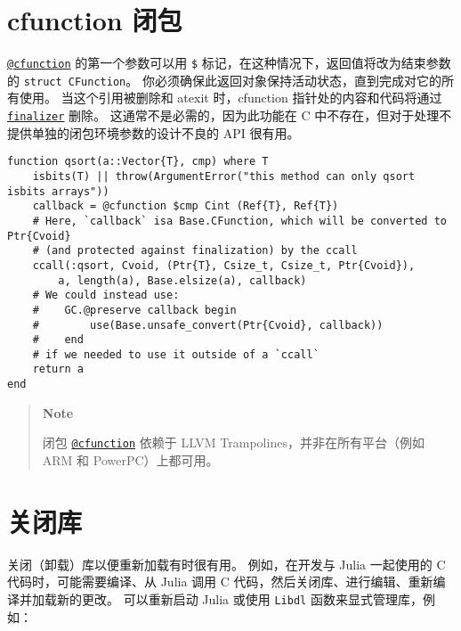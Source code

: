 \hypertarget{1672217310774962173}{}


\section{cfunction 闭包}



\hyperlink{11617107520401351255}{\texttt{@cfunction}} 的第一个参数可以用 \texttt{\$} 标记，在这种情况下，返回值将改为结束参数的 \texttt{struct CFunction}。 你必须确保此返回对象保持活动状态，直到完成对它的所有使用。 当这个引用被删除和 atexit 时，cfunction 指针处的内容和代码将通过 \hyperlink{4805357059330171046}{\texttt{finalizer}} 删除。 这通常不是必需的，因为此功能在 C 中不存在，但对于处理不提供单独的闭包环境参数的设计不良的 API 很有用。




\begin{verbatim}
function qsort(a::Vector{T}, cmp) where T
    isbits(T) || throw(ArgumentError("this method can only qsort isbits arrays"))
    callback = @cfunction $cmp Cint (Ref{T}, Ref{T})
    # Here, `callback` isa Base.CFunction, which will be converted to Ptr{Cvoid}
    # (and protected against finalization) by the ccall
    ccall(:qsort, Cvoid, (Ptr{T}, Csize_t, Csize_t, Ptr{Cvoid}),
        a, length(a), Base.elsize(a), callback)
    # We could instead use:
    #    GC.@preserve callback begin
    #        use(Base.unsafe_convert(Ptr{Cvoid}, callback))
    #    end
    # if we needed to use it outside of a `ccall`
    return a
end
\end{verbatim}



\begin{quote}
\textbf{Note}

闭包 \hyperlink{11617107520401351255}{\texttt{@cfunction}} 依赖于 LLVM Trampolines，并非在所有平台（例如 ARM 和 PowerPC）上都可用。

\end{quote}


\hypertarget{10600174375111035081}{}


\section{关闭库}



关闭（卸载）库以便重新加载有时很有用。 例如，在开发与 Julia 一起使用的 C 代码时，可能需要编译、从 Julia 调用 C 代码，然后关闭库、进行编辑、重新编译并加载新的更改。 可以重新启动 Julia 或使用 \texttt{Libdl} 函数来显式管理库，例如：




